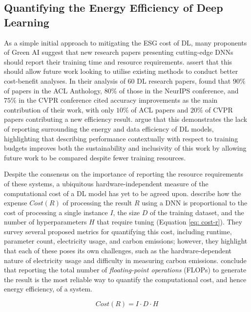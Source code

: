 \documentclass[a4paper, 11pt]{report}
\begin{document}
    \subsection{Quantifying the Energy Efficiency of Deep Learning}

    As a simple initial approach to mitigating the ESG cost of DL, many proponents of Green AI suggest that new research papers presenting cutting-edge DNNs should report their training time and resource requirements. \citet{strubell-2019} assert that this should allow future work looking to utilise existing methods to conduct better cost-benefit analyses. In their analysis of 60 DL research papers, \citet{schwartz-2019} found that $90\%$ of papers in the ACL Anthology, $80\%$ of those in the NeurIPS conference, and $75\%$ in the CVPR conference cited accuracy improvements as the main contribution of their work, with only $10\%$ of ACL papers and $20\%$ of CVPR papers contributing a new efficiency result. \citet{schwartz-2019} argue that this demonstrates the lack of reporting surrounding the energy and data efficiency of DL models, highlighting that describing performance contextually with respect to training budgets improves both the sustainability and inclusivity of this work by allowing future work to be compared despite fewer training resources.

    Despite the consensus on the importance of reporting the resource requirements of these systems, a ubiquitous hardware-independent measure of the computational cost of a DL model has yet to be agreed upon. \citet{schwartz-2019} describe how the expense $Cost(R)$ of processing the result $R$ using a DNN is proportional to the cost of processing a single instance $I$, the size $D$ of the training dataset, and the number of hyperparameters $H$ that require tuning (Equation \ref{eq: cost-r}). They survey several proposed metrics for quantifying this cost, including runtime, parameter count, electricity usage, and carbon emissions; however, they highlight that each of these poses its own challenges, such as the hardware-dependent nature of electricity usage and difficulty in measuring carbon emissions. \citet{schwartz-2019} conclude that reporting the total number of \emph{floating-point operations} (FLOPs) to generate the result is the most reliable way to quantify the computational cost, and hence energy efficiency, of a system.

    \begin{equation}
        \label{eq: cost-r}
        Cost(R) = I \cdot D \cdot H
    \end{equation}
\end{document}
